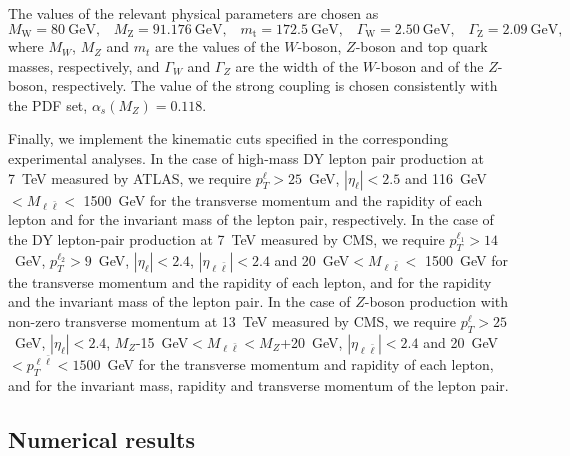 The values of the relevant physical parameters are chosen as
\begin{equation}
M_\mathrm{W} = \SI{80}{\giga\electronvolt} \text{,} \quad 
M_\mathrm{Z} = \SI{91.176}{\giga\electronvolt} \text{,} \quad 
m_\mathrm{t} = \SI{172.5}{\giga\electronvolt} \text{,} \quad
\Gamma_\mathrm{W} = \SI{2.50}{\giga\electronvolt} \text{,} \quad
\Gamma_\mathrm{Z} = \SI{2.09}{\giga\electronvolt} \text{,} 
\label{eq:parameters}
\end{equation}
where $M_W$, $M_Z$ and $m_t$ are the values of the $W$-boson, $Z$-boson and
top quark masses, respectively, and $\Gamma_W$ and $\Gamma_Z$ are the width of
the $W$-boson and of the $Z$-boson, respectively. The value of the strong
coupling is chosen consistently with the PDF set, $\alpha_s(M_Z)=0.118$.

Finally, we implement the kinematic cuts specified in the corresponding
experimental analyses. In the case of high-mass DY lepton pair
production at 7~TeV measured by ATLAS, we require $p_T^\ell>25$~GeV,
$|\eta_\ell|<2.5$ and 116~GeV$<M_{\ell\bar\ell}<$ 1500~GeV for the transverse
momentum and the rapidity of each lepton and for the invariant mass of the
lepton pair, respectively. In the case of the DY lepton-pair production at
7~TeV measured by CMS, we require $p_T^{\ell_1}>14$~GeV, $p_T^{\ell_2}>9$~GeV,
$|\eta_\ell|<2.4$, $|\eta_{\ell\bar\ell}|<2.4$ and 20~GeV$<M_{\ell\bar\ell}<$ 1500~GeV
for the transverse momentum and the rapidity of each lepton, and for the
rapidity and the invariant mass of the lepton pair. In the case of $Z$-boson
production with non-zero transverse momentum at 13~TeV measured by CMS, we
require $p_T^\ell>25$~GeV, $|\eta_\ell|<2.4$,
$M_Z$-15~GeV$<M_{\ell\bar\ell}<M_Z$+20~GeV,
$|\eta_{\ell\bar\ell}|<2.4$ and 20~GeV$<p_T^{\ell\bar\ell}<1500$~GeV for the
transverse momentum and rapidity of each lepton, and for the invariant mass,
rapidity and transverse momentum of the lepton pair.

\subsection{Numerical results}
\label{subsec:numerical_results}

